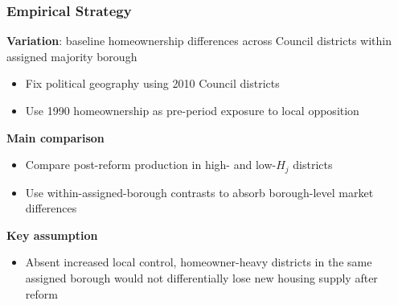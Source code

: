 
\begin{frame}
    \frametitle{Empirical Strategy}
    \small

    \textbf{Variation}: baseline homeownership differences across Council districts within assigned majority borough
    \begin{itemize}
        \item Fix political geography using 2010 Council districts
        \item Use 1990 homeownership as pre-period exposure to local opposition
    \end{itemize}

    \vspace{0.25em}
    \textbf{Main comparison}
    \begin{itemize}
        \item Compare post-reform production in high- and low-\(H_j\) districts
        \item Use within-assigned-borough contrasts to absorb borough-level market differences
    \end{itemize}

    \vspace{0.25em}
    \textbf{Key assumption}
    \begin{itemize}
        \item Absent increased local control, homeowner-heavy districts in the same assigned borough would not differentially lose new housing supply after reform
    \end{itemize}
\end{frame}

